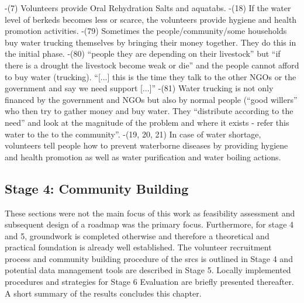 -(7) Volunteers provide Oral Rehydration Salts and aquatabs.
-(18) If the water level of berkeds becomes less or scarce, the volunteers provide hygiene and health promotion activities.
-(79) Sometimes the people/community/some households buy water trucking themselves by bringing their money together. They do this in the initial phase.
-(80) “people they are depending on their livestock” but “if there is a drought the livestock become weak or die” and the people cannot afford to buy water (trucking). “[...] this is the time they talk to the other NGOs or the government and say we need support [...]”
-(81) Water trucking is not only financed by the government and NGOs but also by normal people (“good willers” who then try to gather money and buy water. They “distribute according to the need” and look at the magnitude of the problem and where it exists - refer this water to the to the community”.
-(19, 20, 21) In case of water shortage, volunteers tell people how to prevent waterborne diseases by providing hygiene and health promotion as well as water purification and water boiling actions.





\subsection{Stage 4: Community Building} %

These sections were not the main focus of this work as feasibility assessment and subsequent design of a roadmap was the primary focus. Furthermore, for stage 4 and 5, groundwork is completed otherwise and therefore a theoretical and practical foundation is already well established. The volunteer recruitment process and community building procedure of the \acrshort*{srcs} is outlined in Stage 4 and potential data management tools are described in Stage 5. Locally implemented procedures and strategies for Stage 6 Evaluation are briefly presented thereafter. A short summary of the results concludes this chapter.

